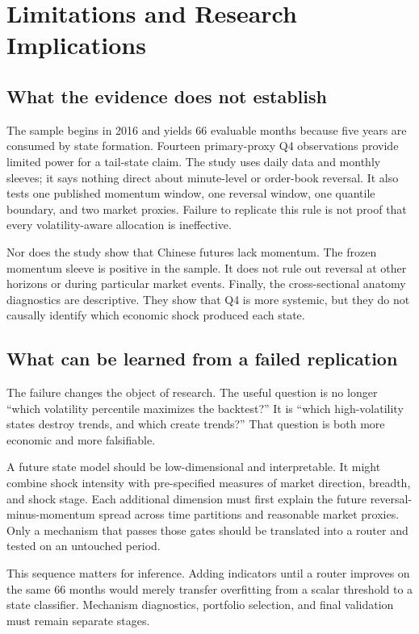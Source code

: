 \section{Limitations and Research Implications}

\subsection{What the evidence does not establish}

The sample begins in 2016 and yields 66 evaluable months because five years are consumed
by state formation. Fourteen primary-proxy Q4 observations provide limited power for a
tail-state claim. The study uses daily data and monthly sleeves; it says nothing direct
about minute-level or order-book reversal. It also tests one published momentum window,
one reversal window, one quantile boundary, and two market proxies. Failure to replicate
this rule is not proof that every volatility-aware allocation is ineffective.

Nor does the study show that Chinese futures lack momentum. The frozen momentum sleeve is
positive in the sample. It does not rule out reversal at other horizons or during
particular market events. Finally, the cross-sectional anatomy diagnostics are
descriptive. They show that Q4 is more systemic, but they do not causally identify which
economic shock produced each state.

\subsection{What can be learned from a failed replication}

The failure changes the object of research. The useful question is no longer ``which
volatility percentile maximizes the backtest?'' It is ``which high-volatility states
destroy trends, and which create trends?'' That question is both more economic and more
falsifiable.

A future state model should be low-dimensional and interpretable. It might combine shock
intensity with pre-specified measures of market direction, breadth, and shock stage. Each
additional dimension must first explain the future reversal-minus-momentum spread across
time partitions and reasonable market proxies. Only a mechanism that passes those gates
should be translated into a router and tested on an untouched period.

This sequence matters for inference. Adding indicators until a router improves on the
same 66 months would merely transfer overfitting from a scalar threshold to a state
classifier. Mechanism diagnostics, portfolio selection, and final validation must remain
separate stages.

